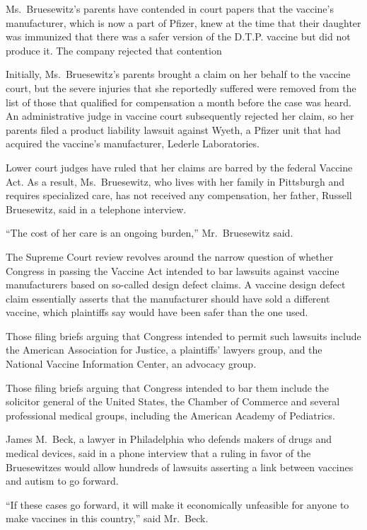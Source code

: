 ﻿\documentclass[12pt]{article}
\begin{document}
Ms.~Bruesewitz's parents have contended in court papers that the vaccine's manufacturer, which is
now a part of Pfizer, knew at the time that their daughter was immunized that there was a safer
version of the D.T.P. vaccine but did not produce it. The company rejected that contention

Initially, Ms.~Bruesewitz's parents brought a claim on her behalf to the vaccine court, but the
severe injuries that she reportedly suffered were removed from the list of those that qualified for
compensation a month before the case was heard. An administrative judge in vaccine court
subsequently rejected her claim, so her parents filed a product liability lawsuit against Wyeth, a
Pfizer unit that had acquired the vaccine's manufacturer, Lederle Laboratories.

Lower court judges have ruled that her claims are barred by the federal Vaccine Act. As a result,
Ms.~Bruesewitz, who lives with her family in Pittsburgh and requires specialized care, has not
received any compensation, her father, Russell Bruesewitz, said in a telephone interview.

``The cost of her care is an ongoing burden,'' Mr.~Bruesewitz said.

The Supreme Court review revolves around the narrow question of whether Congress in passing the
Vaccine Act intended to bar lawsuits against vaccine manufacturers based on so-called design defect
claims. A vaccine design defect claim essentially asserts that the manufacturer should have sold a
different vaccine, which plaintiffs say would have been safer than the one used.

Those filing briefs arguing that Congress intended to permit such lawsuits include the American
Association for Justice, a plaintiffs' lawyers group, and the National Vaccine Information Center,
an advocacy group.

Those filing briefs arguing that Congress intended to bar them include the solicitor general of the
United States, the Chamber of Commerce and several professional medical groups, including the
American Academy of Pediatrics.

James M.~Beck, a lawyer in Philadelphia who defends makers of drugs and medical devices, said in a
phone interview that a ruling in favor of the Bruesewitzes would allow hundreds of lawsuits
asserting a link between vaccines and autism to go forward.

``If these cases go forward, it will make it economically unfeasible for anyone to make vaccines in
this country,'' said Mr.~Beck.
\end{document}
